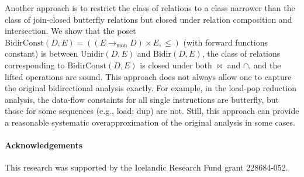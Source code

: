 \documentclass{easychair}
\theoremstyle{definition}
\newcommand{\Bidir}{\mathrm{Bidir}}
\newcommand{\Unidir}{\mathrm{Unidir}}
\newcommand{\UnidirConst}{\mathrm{BidirConst}}
\newcommand{\tomon}{\to_{\mathrm{mon}}}
\begin{document}
Another approach is to restrict the class of relations to a class narrower than the class of join-closed butterfly relations but closed under relation composition and intersection. We show that the poset $\UnidirConst(D, E) = ((E \tomon D) \times E, \leq)$ (with forward functions constant) is between $\Unidir(D , E)$ and $\Bidir(D, E)$, the class of relations corresponding to $\UnidirConst(D, E)$ is  closed under both $\bowtie$ and $\cap$, and the lifted operations are sound.
This approach does not always allow one to capture the original bidirectional analysis exactly. For example, in the load-pop reduction analysis, the data-flow constaints for all single instructions are butterfly, but those for some sequences (e.g., \textsf{load}; \textsf{dup}) are not. Still, this approach can provide a reasonable systematic overapproximation of the original analysis in some cases.

\paragraph{Acknowledgements} This research was supported by the
Icelandic Research Fund grant 228684-052.



\end{document}
